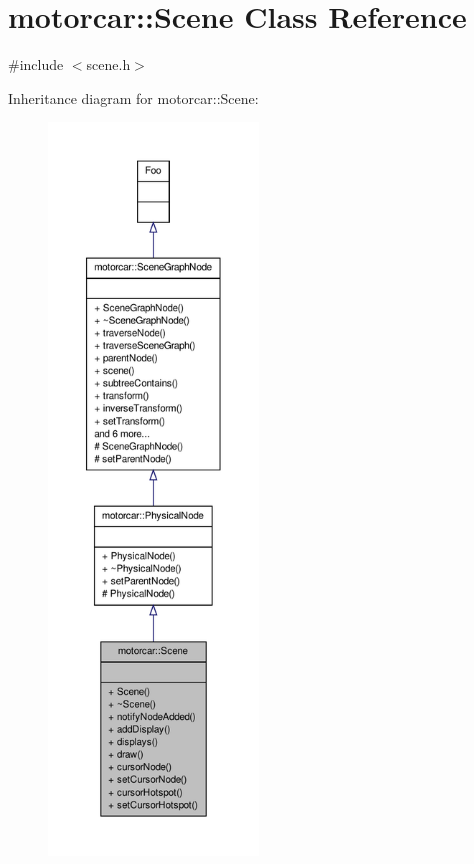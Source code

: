 \hypertarget{classmotorcar_1_1Scene}{\section{motorcar\-:\-:Scene Class Reference}
\label{classmotorcar_1_1Scene}
}


{\ttfamily \#include $<$scene.\-h$>$}



Inheritance diagram for motorcar\-:\-:Scene\-:
\nopagebreak
\begin{figure}[H]
\begin{center}
\leavevmode
\includegraphics[height=550pt]{classmotorcar_1_1Scene__inherit__graph}
\end{center}
\end{figure}


